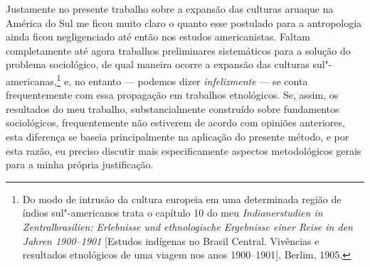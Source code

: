 {Justamente no presente trabalho sobre a expansão das culturas aruaque na
América do Sul me ficou muito claro o quanto esse postulado para a
antropologia ainda ficou negligenciado até então nos estudos
americanistas. Faltam completamente até agora trabalhos preliminares
sistemáticos para a solução do problema sociológico, de qual maneira
ocorre a expansão das culturas sul"-americanas,\footnote{Do modo de
  intrusão da cultura europeia em uma determinada região de índios
  sul"-americanos trata o capítulo 10 do meu \textit{Indianerstudien in
  Zentralbrasilien: Erlebnisse und ethnologische Ergebnisse einer Reise
  in den Jahren 1900--1901} {[}Estudos indígenas no Brasil Central.
  Vivências e resultados etnológicos de uma viagem nos anos
  1900--1901{]}, Berlim, 1905.} e, no entanto --- podemos dizer
\textit{infelizmente} --- se conta frequentemente com essa propagação em
trabalhos etnológicos. Se, assim, os resultados do meu trabalho,
substancialmente construído sobre fundamentos sociológicos,
frequentemente não estiverem de acordo com opiniões anteriores, esta
diferença se baseia principalmente na aplicação do presente método, e
por esta razão, eu preciso discutir mais especificamente aspectos
metodológicos gerais para a minha própria justificação.}


